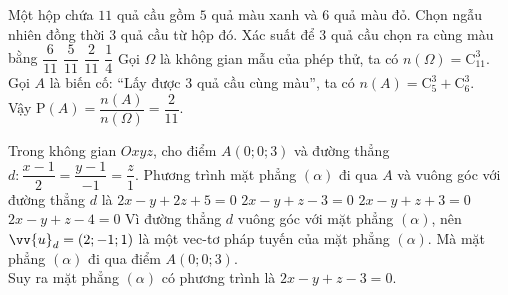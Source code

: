 \documentclass[12pt,a4paper,oneside]{book}
\def\vec{\vv}
\begin{document}
\begin{ex}%
	Một hộp chứa $11$ quả cầu gồm $5$ quả màu xanh và $6$ quả màu đỏ. Chọn ngẫu nhiên đồng thời $3$ quả cầu từ hộp đó. Xác suất để $3$ quả cầu chọn ra cùng màu bằng
	\choice
	{$\dfrac{6}{11}$}
	{$\dfrac{5}{11}$}
	{\True$\dfrac{2}{11}$}
	{$\dfrac{1}{4}$}
	\loigiai
	{ Gọi $\Omega$ là không gian mẫu của phép thử, ta có $n(\Omega)= \mathrm{C}_{11}^3$.\\
		Gọi $A$ là biến cố: ``Lấy được $3$ quả cầu cùng màu'', ta có $n(A)= \mathrm{C}_{5}^3+\mathrm{C}_{6}^3.$\\
		Vậy $\mathrm{P}(A)=\dfrac{n(A)}{n(\Omega)}= \dfrac{2}{11}.$
	}
\end{ex}

\begin{ex}%
	Trong không gian $Oxyz$, cho điểm $A(0;0;3)$ và đường thẳng $d
	\colon \dfrac{x-1}{2}=\dfrac{y-1}{-1}=\dfrac{z}{1}$. Phương trình mặt phẳng $(\alpha)$ đi qua $A$ và vuông góc với đường thẳng $d$ là
	\choice
	{$2x-y+2z+5=0$}
	{\True $2x-y+z-3=0$}
	{$2x-y+z+3=0$}
	{$2x-y+z-4=0$}
	\loigiai
	{ Vì đường thẳng $d$ vuông góc với mặt phẳng $(\alpha)$, nên $\vec{u}_d=(2;-1;1)$ là một vec-tơ pháp tuyến của mặt phẳng $(\alpha)$. Mà mặt phẳng $(\alpha)$ đi qua điểm $A(0;0;3)$.\\
		Suy ra mặt phẳng $(\alpha)$ có phương trình là $2x-y+z-3=0.$ 
	}
\end{ex}
\end{document}
